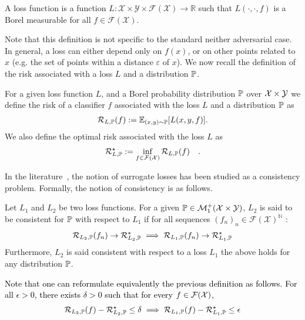 \begin{definition} A loss function is a function $L:\mathcal{X}\times\mathcal{Y}\times \mathcal{F}(\mathcal{X})\to \mathbb{R}$ such that $L(\cdot,\cdot,f)$ is a Borel measurable for all $f\in\mathcal{F}(\mathcal{X})$. 
\end{definition}
Note that this definition is not specific to the standard neither adversarial case. In general, a loss can either depend only on $f(x)$, or on other points related to $x$ (e.g. the set of points within a distance $\varepsilon$ of $x$). We now recall the definition of the risk associated with a loss $L$ and a distribution $\mathbb{P}$. 
\begin{definition}
For a given loss function $L$, and a Borel probability distribution $\mathbb{P}$ over $\mathcal{X}\times\mathcal{Y}$ we define the risk of a classifier $f$ associated with the loss $L$ and a distribution $\mathbb{P}$ as
\begin{align*}
     \risk_{L,\PP}(f) := \mathbb{E}_{(x,y)\sim\PP}\left[L(x,y,f)\right].
\end{align*}
We also define the optimal risk associated with the loss $L$ as
\begin{align*}
         \mathcal{R}_{L,\mathbb{P}}^\star := \inf_{f\in\mathcal{F}(\mathcal{X})}\mathcal{R}_{L,\mathbb{P}}(f)\quad.
\end{align*}
\end{definition}

In the literature~\citep{zhang2004statistical,bartlett2006convexity,steinwart2007compare}, the notion of surrogate losses has been studied as a consistency problem. Formally, the notion of consistency is as  follows.

\begin{definition}[Consistency]
Let $L_1$ and $L_2$ be two loss functions. For a given $\mathbb{P}\in\mathcal{M}_1^+(\mathcal{X}\times\mathcal{Y})$, $L_2$ is said to be consistent for $\mathbb{P}$ with respect to $L_1$ if for all sequences $(f_n)_n \in \mathcal{F}(\mathcal{X})^\mathbb{N}$ :
\begin{align}
    \mathcal{R}_{L_2,\mathbb{P}}(f_n)\to \mathcal{R}_{L_2,\mathbb{P}}^\star\implies\mathcal{R}_{L_1,\mathbb{P}}(f_n)\to \mathcal{R}_{L_1,\mathbb{P}}^\star
\end{align}
Furthermore, $L_2$ is said consistent with respect to a loss $L_1$ the above holds for any distribution $\mathbb{P}$.
\end{definition}

\textcolor{black}{
Note that one can reformulate equivalently the previous definition as follows.  For all $\epsilon>0$, there exists $\delta>0$ such that for every $f\in\mathcal{F}(\mathcal{X})$,
\begin{align*}
    \mathcal{R}_{L_2,\mathbb{P}}(f)- \mathcal{R}_{L_2,\mathbb{P}}^\star\leq\delta\implies\mathcal{R}_{L_1,\mathbb{P}}(f)-\mathcal{R}_{L_1,\mathbb{P}}^\star\leq\epsilon
\end{align*}
}

